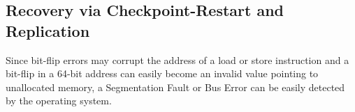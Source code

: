 \documentclass{sig-alternate}
\begin{document}
%
%
%
%

\subsection{Recovery via Checkpoint-Restart and \\Replication}
\label{sec:res_tech:cr}
Since bit-flip errors may corrupt the address of a load or store instruction and a bit-flip in a 64-bit address can easily become an invalid value pointing to
unallocated memory, a Segmentation Fault or Bus Error can be easily detected by the operating system.\\
\end{document}
